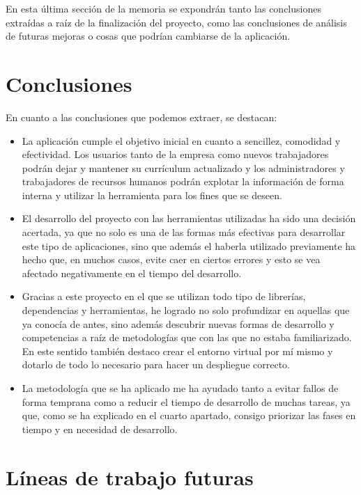 
En esta última sección de la memoria se expondrán tanto las conclusiones extraídas a raíz de la finalización del proyecto, como las conclusiones de análisis de futuras mejoras o cosas que podrían cambiarse de la aplicación.

\section{Conclusiones}

En cuanto a las conclusiones que podemos extraer, se destacan:

\begin{itemize}
\item
  La aplicación cumple el objetivo inicial en cuanto a sencillez, comodidad y efectividad.
  Los usuarios tanto de la empresa como nuevos trabajadores podrán dejar y mantener su currículum actualizado y los administradores y trabajadores de recursos humanos podrán explotar la información de forma interna y utilizar la herramienta para los fines que se deseen.
\item
  El desarrollo del proyecto con las herramientas utilizadas ha sido una decisión acertada, ya que no solo es una de las formas más efectivas para desarrollar este tipo de aplicaciones, sino que además el haberla utilizado previamente ha hecho que, en muchos casos, evite caer en ciertos errores y esto se vea afectado negativamente en el tiempo del desarrollo.
\item
  Gracias a este proyecto en el que se utilizan todo tipo de librerías, dependencias y herramientas, he logrado no solo profundizar en aquellas que ya conocía de antes, sino además descubrir nuevas formas de desarrollo y competencias a raíz de metodologías que con las que no estaba familiarizado. En este sentido también destaco crear el entorno virtual por mí mismo y dotarlo de todo lo necesario para hacer un despliegue correcto.
\item
  La metodología que se ha aplicado me ha ayudado tanto a evitar fallos de forma temprana como a reducir el tiempo de desarrollo de muchas tareas, ya que, como se ha explicado en el cuarto apartado, consigo priorizar las fases en tiempo y en necesidad de desarrollo.
\end{itemize}

\section{Líneas de trabajo futuras}

